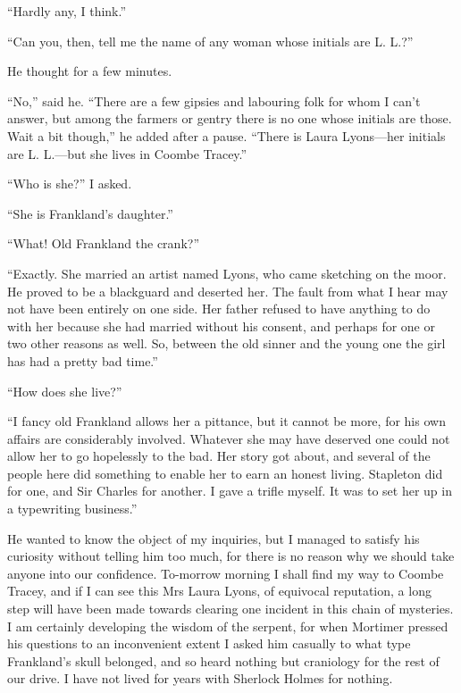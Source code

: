 \documentclass[paper=5.5in:8.5in,BCOR=7mm,twoside,DIV=calc,12pt,usegeometry,openany,chapterprefix,endperiod]{scrbook} %
\begin{document}
\enquote{Hardly any, I think.}

\enquote{Can you, then, tell me the name of any woman whose initials are L. L.?}

He thought for a few minutes.

\enquote{No,} said he. \enquote{There are a few gipsies and labouring folk for whom I can't answer, but among the farmers or gentry there is no one whose initials are those. Wait a bit though,} he added after a pause. \enquote{There is Laura Lyons\nobreakdash---her initials are L. L.\nobreakdash---but she lives in Coombe Tracey.}

\enquote{Who is she?} I asked.

\enquote{She is Frankland's daughter.}

\enquote{What! Old Frankland the crank?}

\enquote{Exactly. She married an artist named Lyons, who came sketching on the moor. He proved to be a blackguard and deserted her. The fault from what I hear may not have been entirely on one side. Her father refused to have anything to do with her because she had married without his consent, and perhaps for one or two other reasons as well. So, between the old sinner and the young one the girl has had a pretty bad time.}

\enquote{How does she live?}

\enquote{I fancy old Frankland allows her a pittance, but it cannot be more, for his own affairs are considerably involved. Whatever she may have deserved one could not allow her to go hopelessly to the bad. Her story got about, and several of the people here did something to enable her to earn an honest living. Stapleton did for one, and Sir Charles for another. I gave a trifle myself. It was to set her up in a typewriting business.}

He wanted to know the object of my inquiries, but I managed to satisfy his curiosity without telling him too much, for there is no reason why we should take anyone into our confidence. To-morrow morning I shall find my way to Coombe Tracey, and if I can see this Mrs Laura Lyons, of equivocal reputation, a long step will have been made towards clearing one incident in this chain of mysteries. I am certainly developing the wisdom of the serpent, for when Mortimer pressed his questions to an inconvenient extent I asked him casually to what type Frankland's skull belonged, and so heard nothing but craniology for the rest of our drive. I have not lived for years with Sherlock Holmes for nothing.
\end{document}
